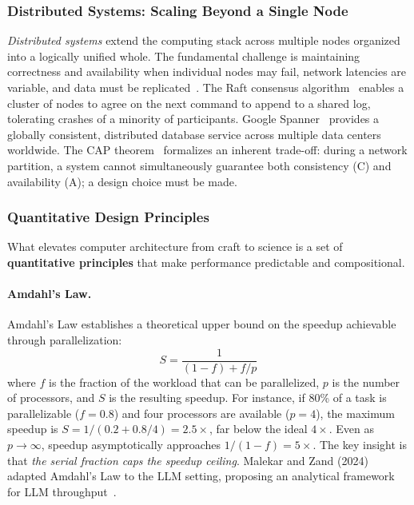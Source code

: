 \documentclass[11pt,a4paper]{article}
\begin{document}
\subsubsection{Distributed Systems: Scaling Beyond a Single Node}

\textit{Distributed systems} extend the computing stack across multiple nodes organized into a logically unified whole.
The fundamental challenge is maintaining correctness and availability when individual nodes may fail, network latencies are variable, and data must be replicated~\cite{cap2002}.
The Raft consensus algorithm~\cite{raft2014} enables a cluster of nodes to agree on the next command to append to a shared log, tolerating crashes of a minority of participants.
Google Spanner~\cite{spanner2012} provides a globally consistent, distributed database service across multiple data centers worldwide.
The CAP theorem~\cite{cap2002} formalizes an inherent trade-off: during a network partition, a system cannot simultaneously guarantee both consistency (C) and availability (A); a design choice must be made.

\subsubsection{Quantitative Design Principles}

What elevates computer architecture from craft to science is a set of \textbf{quantitative principles} that make performance predictable and compositional.

\paragraph{Amdahl's Law.}
Amdahl's Law establishes a theoretical upper bound on the speedup achievable through parallelization:
\begin{equation}
\label{eq:amdahl}
S = \frac{1}{(1-f) + f/p}
\end{equation}
where $f$ is the fraction of the workload that can be parallelized, $p$ is the number of processors, and $S$ is the resulting speedup.
For instance, if 80\% of a task is parallelizable ($f=0.8$) and four processors are available ($p=4$), the maximum speedup is $S = 1/(0.2 + 0.8/4) = 2.5\times$, far below the ideal $4\times$.
Even as $p \to \infty$, speedup asymptotically approaches $1/(1-f) = 5\times$.
The key insight is that \emph{the serial fraction caps the speedup ceiling}.
Malekar and Zand (2024) adapted Amdahl's Law to the LLM setting, proposing an analytical framework for LLM throughput~\cite{malekar2024amdahlllm}.
\end{document}
